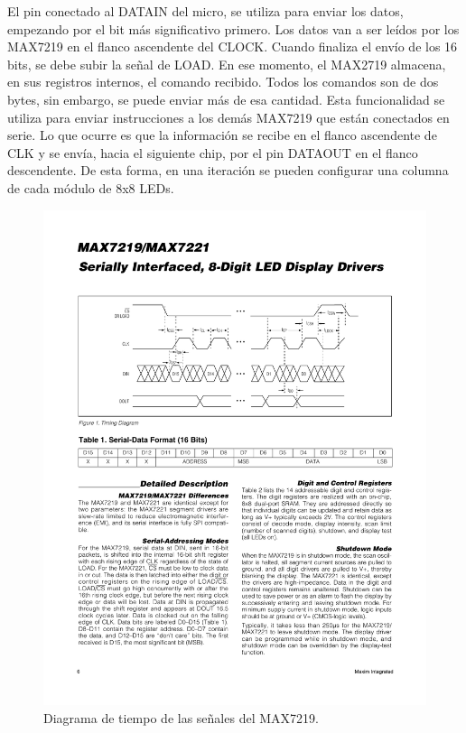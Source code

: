 El pin conectado al DATAIN del micro, se utiliza para enviar los datos, empezando por el bit más significativo primero. Los datos van a ser leídos por los MAX7219 en el flanco ascendente del CLOCK. Cuando finaliza el envío de los 16 bits, se debe subir la señal de LOAD. En ese momento, el MAX2719 almacena, en sus registros internos, el comando recibido. Todos los comandos son de dos bytes, sin embargo, se puede enviar más de esa cantidad. Esta funcionalidad se utiliza para enviar instrucciones a los demás MAX7219 que están conectados en serie. Lo que ocurre es que la información se recibe en el flanco ascendente de CLK y se envía, hacia el siguiente chip, por el pin DATAOUT en el flanco descendente. De esta forma, en una iteración se pueden configurar una columna de cada módulo de 8x8 LEDs.

\begin{figure}[ht!]
	\centering
	\begin{center}
		\includegraphics[width=\textwidth]{imagenes/hw/timingDiagram.pdf}
		\caption{Diagrama de tiempo de las señales del MAX7219.}
		\label{fig:spi-timing-diagram}
	\end{center}
\end{figure}



